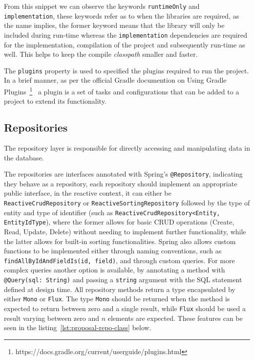 From this snippet we can observe the keywords \lstinline{runtimeOnly} and \lstinline{implementation}, these keywords refer as to when the libraries are required, as the name implies, the former keyword means that the library will only be included during run-time whereas the \lstinline{implementation} dependencies are required for the implementation, compilation of the project and subsequently run-time as well.
This helps to keep the compile \textit{classpath} smaller and faster.

The \lstinline{plugins} property is used to specified the plugins required to run the project. In a brief manner, as per the official Gradle documention on Using Gradle Plugins~\footnote{https://docs.gradle.org/current/userguide/plugins.html}~\label{fn:spring-gradle-plugins} a plugin is a set of tasks and configurations that can be added to a project to extend its functionality.


\subsection{Repositories}\label{ch:impl:sec:be:subsec:repositories}

The repository layer is responsible for directly accessing and manipulating data in the database. 


The repositories are interfaces annotated with Spring's \lstinline{@Repository}, indicating they behave as a repository, each repository should implement an appropriate public interface, in the reactive context, it can either be \lstinline{ReactiveCrudRepository} or \lstinline{ReactiveSortingRepository} followed by the type of entity and type of identifier (such as \lstinline{ReactiveCrudRepository<Entity, EntityIdType}), where the former allows for basic CRUD operations (Create, Read, Update, Delete) without needing to implement further functionality, while the latter allows for built-in sorting functionalities. Spring also allows custom functions to be implemented either through naming conventions, such as \lstinline{findAllByIdAndFieldIs(id, field)}, and through custom queries. For more complex queries another option is available, by annotating a method with \lstinline{@Query(sql: String)} and passing a \lstinline{string} argument with the SQL statement defined at design time. All repository methods return a type encapsulated by either \texttt{Mono} or \texttt{Flux}. The type \texttt{Mono} should be returned when the method is expected to return between zero and a single result, while \texttt{Flux} should be used a result varying between zero and $n$ elements are expected. These features can be seen in the listing~\ref{lst:proposal-repo-class} below.

